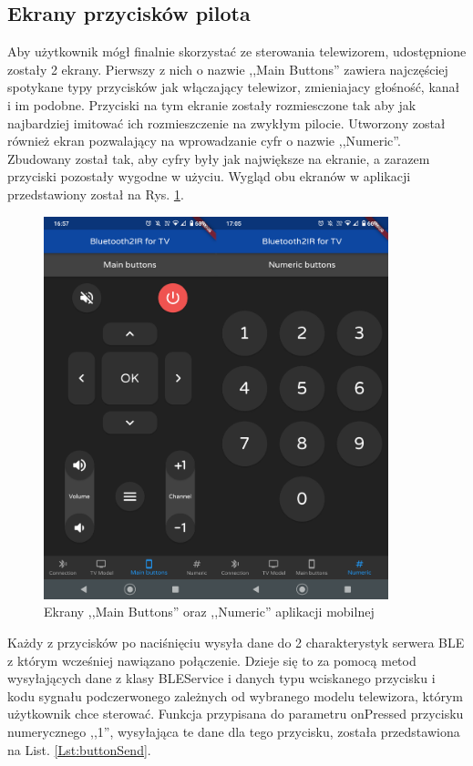 \documentclass[12pt,twoside]{article}
\begin{document}
\subsection{Ekrany przycisków pilota}
Aby użytkownik mógł finalnie skorzystać ze sterowania telewizorem, udostępnione zostały 2 ekrany. Pierwszy z nich o nazwie ,,Main Buttons'' zawiera najczęściej spotykane typy przycisków jak włączający telewizor, zmieniajacy głośność, kanał i im podobne. Przyciski na tym ekranie zostały rozmiesczone tak aby jak najbardziej imitować ich rozmieszczenie na zwykłym pilocie. 
Utworzony został również ekran pozwalający na wprowadzanie cyfr o nazwie ,,Numeric''. Zbudowany został tak, aby cyfry były jak największe na ekranie, a zarazem przyciski pozostały wygodne w użyciu. Wygląd obu ekranów w aplikacji przedstawiony został na Rys. \ref*{Fig:buttonScreens}.

\begin{figure}[ht]
   \centering
   \includegraphics[width=10cm]{images/buttonScreens.png}
   \caption{Ekrany ,,Main Buttons'' oraz ,,Numeric'' aplikacji mobilnej}
   \label{Fig:buttonScreens}
\end{figure}

Każdy z przycisków po naciśnięciu wysyła dane do 2 charakterystyk serwera BLE z którym wcześniej nawiązano połączenie. Dzieje się to za pomocą metod wysyłających dane z klasy BLEService i danych typu wciskanego przycisku i kodu sygnału podczerwonego zależnych od wybranego modelu telewizora, którym użytkownik chce sterować. Funkcja przypisana do parametru onPressed przycisku numerycznego ,,1'', wysyłająca te dane dla tego przycisku, została przedstawiona na List. \ref*{Lst:buttonSend}.
\end{document}
